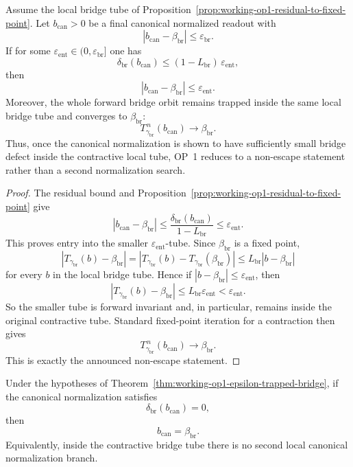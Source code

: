 \begin{theorem}
\label{thm:working-op1-epsilon-trapped-bridge}
Assume the local bridge tube of Proposition~\ref{prop:working-op1-residual-to-fixed-point}. Let \(b_{\mathrm{can}}>0\) be a final canonical normalized readout with
\[
 |b_{\mathrm{can}}-\beta_{\mathrm{br}}|\le \varepsilon_{\mathrm{br}}.
\]
If for some \(\varepsilon_{\mathrm{ent}}\in(0,\varepsilon_{\mathrm{br}}]\) one has
\[
 \delta_{\mathrm{br}}(b_{\mathrm{can}})
 \le
 (1-L_{\mathrm{br}})\,\varepsilon_{\mathrm{ent}},
\]
then
\[
 |b_{\mathrm{can}}-\beta_{\mathrm{br}}|\le \varepsilon_{\mathrm{ent}}.
\]
Moreover, the whole forward bridge orbit remains trapped inside the same local bridge tube and converges to \(\beta_{\mathrm{br}}\):
\[
 T_{\gamma_{\mathrm{br}}}^{\,n}(b_{\mathrm{can}})\to \beta_{\mathrm{br}}.
\]
Thus, once the canonical normalization is shown to have sufficiently small bridge defect inside the contractive local tube, OP~1 reduces to a non-escape statement rather than a second normalization search.
\end{theorem}

\begin{proof}
The residual bound and Proposition~\ref{prop:working-op1-residual-to-fixed-point} give
\[
 |b_{\mathrm{can}}-\beta_{\mathrm{br}}|
 \le
 \frac{\delta_{\mathrm{br}}(b_{\mathrm{can}})}{1-L_{\mathrm{br}}}
 \le
 \varepsilon_{\mathrm{ent}}.
\]
This proves entry into the smaller \(\varepsilon_{\mathrm{ent}}\)-tube. Since \(\beta_{\mathrm{br}}\) is a fixed point,
\[
 |T_{\gamma_{\mathrm{br}}}(b)-\beta_{\mathrm{br}}|
 =
 |T_{\gamma_{\mathrm{br}}}(b)-T_{\gamma_{\mathrm{br}}}(\beta_{\mathrm{br}})|
 \le
 L_{\mathrm{br}}|b-\beta_{\mathrm{br}}|
\]
for every \(b\) in the local bridge tube. Hence if \(|b-\beta_{\mathrm{br}}|\le \varepsilon_{\mathrm{ent}}\), then
\[
 |T_{\gamma_{\mathrm{br}}}(b)-\beta_{\mathrm{br}}|
 \le
 L_{\mathrm{br}}\varepsilon_{\mathrm{ent}}
 <
 \varepsilon_{\mathrm{ent}}.
\]
So the smaller tube is forward invariant and, in particular, remains inside the original contractive tube. Standard fixed-point iteration for a contraction then gives
\[
 T_{\gamma_{\mathrm{br}}}^{\,n}(b_{\mathrm{can}})\to \beta_{\mathrm{br}}.
\]
This is exactly the announced non-escape statement.
\end{proof}

\begin{corollary}
\label{cor:working-op1-exact-closure-criterion}
Under the hypotheses of Theorem~\ref{thm:working-op1-epsilon-trapped-bridge}, if the canonical normalization satisfies
\[
 \delta_{\mathrm{br}}(b_{\mathrm{can}})=0,
\]
then
\[
 b_{\mathrm{can}}=\beta_{\mathrm{br}}.
\]
Equivalently, inside the contractive bridge tube there is no second local canonical normalization branch.
\end{corollary}

